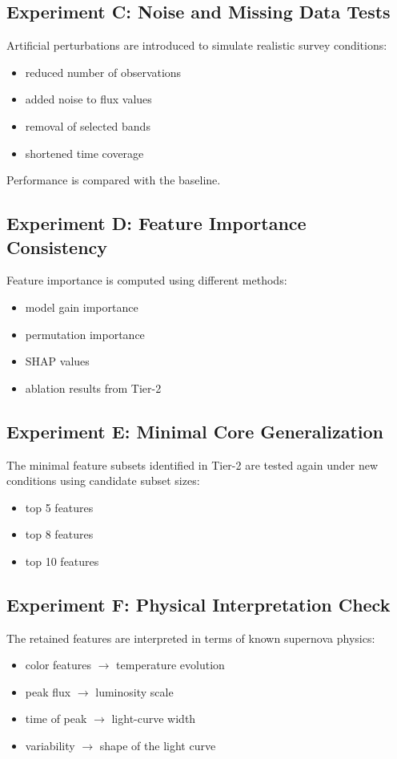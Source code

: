 \subsection{Experiment C: Noise and Missing Data Tests}

Artificial perturbations are introduced to simulate realistic survey conditions:
\begin{itemize}
\item reduced number of observations
\item added noise to flux values
\item removal of selected bands
\item shortened time coverage
\end{itemize}

Performance is compared with the baseline.

\subsection{Experiment D: Feature Importance Consistency}

Feature importance is computed using different methods:
\begin{itemize}
\item model gain importance
\item permutation importance
\item SHAP values
\item ablation results from Tier-2
\end{itemize}

\subsection{Experiment E: Minimal Core Generalization}

The minimal feature subsets identified in Tier-2 are tested again under
new conditions using candidate subset sizes:
\begin{itemize}
\item top 5 features
\item top 8 features
\item top 10 features
\end{itemize}

\subsection{Experiment F: Physical Interpretation Check}

The retained features are interpreted in terms of known supernova physics:
\begin{itemize}
\item color features $\rightarrow$ temperature evolution
\item peak flux $\rightarrow$ luminosity scale
\item time of peak $\rightarrow$ light-curve width
\item variability $\rightarrow$ shape of the light curve
\end{itemize}

